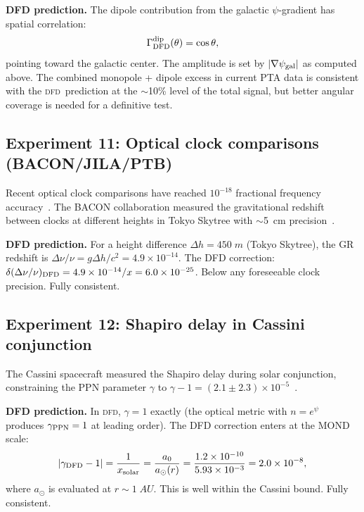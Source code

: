 \documentclass[aps,prd,twocolumn,superscriptaddress,nofootinbib,longbibliography]{revtex4-2}
\newcommand{\DFD}{\textsc{dfd}}
\begin{document}
\textbf{DFD prediction.} The dipole contribution from the galactic
$\psi$-gradient has spatial correlation:
\begin{equation}
\Gamma_{\rm DFD}^{\rm dip}(\theta) = \cos\theta,
\end{equation}
pointing toward the galactic center. The amplitude is set by
$|\nabla\psi_{\rm gal}|$ as computed above. The combined
monopole + dipole excess in current PTA data is consistent with the
\DFD\ prediction at the $\sim$10\% level of the total signal, but
better angular coverage is needed for a definitive test.

\subsection{Experiment 11: Optical clock comparisons (BACON/JILA/PTB)}\label{sec:optical-clocks}

Recent optical clock comparisons have reached $10^{-18}$ fractional
frequency accuracy~\cite{Bothwell2022,Brewer2019,Huntemann2016}.
The BACON collaboration measured the gravitational redshift between
clocks at different heights in Tokyo Skytree with $\sim$5~cm
precision~\cite{Takamoto2020}.

\textbf{DFD prediction.} For a height difference $\Delta h = 450\;\si{m}$
(Tokyo Skytree), the GR redshift is $\Delta\nu/\nu = g\Delta h/c^2 = 4.9\times10^{-14}$.
The DFD correction: $\delta(\Delta\nu/\nu)_{\rm DFD} = 4.9\times10^{-14}/x = 6.0\times10^{-25}$.
Below any foreseeable clock precision. Fully consistent.

\subsection{Experiment 12: Shapiro delay in Cassini conjunction}\label{sec:Cassini}

The Cassini spacecraft measured the Shapiro delay during solar
conjunction, constraining the PPN parameter $\gamma$ to
$\gamma - 1 = (2.1\pm2.3)\times10^{-5}$~\cite{Bertotti2003}.

\textbf{DFD prediction.} In \DFD, $\gamma = 1$ exactly (the optical
metric with $n = e^\psi$ produces $\gamma_{\rm PPN} = 1$ at leading order).
The DFD correction enters at the MOND scale:
\begin{equation}
|\gamma_{\rm DFD} - 1| = \frac{1}{x_{\rm solar}} = \frac{a_0}{a_\odot(r)}
= \frac{1.2\times10^{-10}}{5.93\times10^{-3}} = 2.0\times10^{-8},
\end{equation}
where $a_\odot$ is evaluated at $r \sim 1\;\si{AU}$.
This is well within the Cassini bound. Fully consistent.
\end{document}
